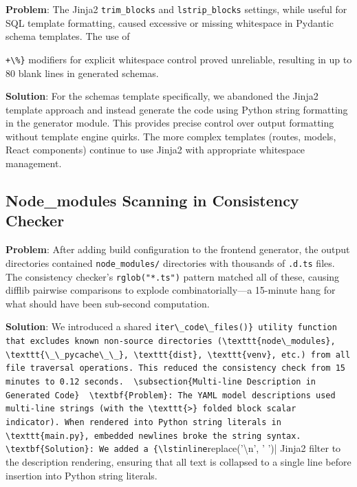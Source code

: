 \documentclass[11pt,a4paper]{article}
\begin{document}
\textbf{Problem}: The Jinja2 \texttt{trim\_blocks} and \texttt{lstrip\_blocks} settings, while useful for SQL template formatting, caused excessive or missing whitespace in Pydantic schema templates. The use of {\lstinline|+\%}| modifiers for explicit whitespace control proved unreliable, resulting in up to 80 blank lines in generated schemas.

\textbf{Solution}: For the schemas template specifically, we abandoned the Jinja2 template approach and instead generate the code using Python string formatting in the generator module. This provides precise control over output formatting without template engine quirks. The more complex templates (routes, models, React components) continue to use Jinja2 with appropriate whitespace management.

\subsection{Node\_modules Scanning in Consistency Checker}

\textbf{Problem}: After adding build configuration to the frontend generator, the output directories contained \texttt{node\_modules/} directories with thousands of \texttt{.d.ts} files. The consistency checker's {\lstinline|rglob("*.ts")|} pattern matched all of these, causing difflib pairwise comparisons to explode combinatorially---a 15-minute hang for what should have been sub-second computation.

\textbf{Solution}: We introduced a shared {\lstinline|iter\_code\_files()} utility function that excludes known non-source directories (\texttt{node\_modules}, \texttt{\_\_pycache\_\_}, \texttt{dist}, \texttt{venv}, etc.) from all file traversal operations. This reduced the consistency check from 15 minutes to 0.12 seconds.

\subsection{Multi-line Description in Generated Code}

\textbf{Problem}: The YAML model descriptions used multi-line strings (with the \texttt{>} folded block scalar indicator). When rendered into Python string literals in \texttt{main.py}, embedded newlines broke the string syntax.

\textbf{Solution}: We added a {\lstinline|replace('\textbackslash n', ' ')|} Jinja2 filter to the description rendering, ensuring that all text is collapsed to a single line before insertion into Python string literals.

}
\end{document}
